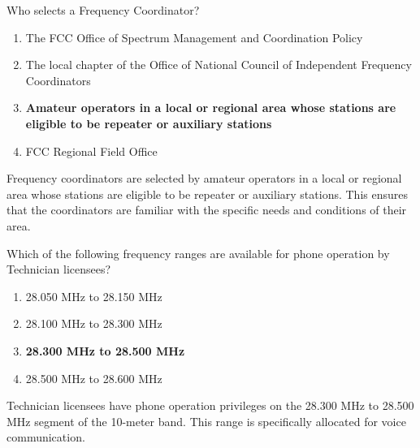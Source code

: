 
\begin{tcolorbox}[colback=gray!10!white,colframe=black!75!black,title={T1A09}]
    Who selects a Frequency Coordinator?
    \begin{enumerate}[label=\Alph*,noitemsep]
        \item The FCC Office of Spectrum Management and Coordination Policy
        \item The local chapter of the Office of National Council of Independent Frequency Coordinators
        \item \textbf{Amateur operators in a local or regional area whose stations are eligible to be repeater or auxiliary stations}
        \item FCC Regional Field Office
    \end{enumerate}
\end{tcolorbox}
Frequency coordinators are selected by amateur operators in a local or regional area whose stations are eligible to be repeater or auxiliary stations. This ensures that the coordinators are familiar with the specific needs and conditions of their area.


\begin{tcolorbox}[colback=gray!10!white,colframe=black!75!black,title={T1B01}]
    Which of the following frequency ranges are available for phone operation by Technician licensees?
    \begin{enumerate}[label=\Alph*,noitemsep]
        \item 28.050 MHz to 28.150 MHz
        \item 28.100 MHz to 28.300 MHz
        \item \textbf{28.300 MHz to 28.500 MHz}
        \item 28.500 MHz to 28.600 MHz
    \end{enumerate}
\end{tcolorbox}
Technician licensees have phone operation privileges on the 28.300 MHz to 28.500 MHz segment of the 10-meter band. This range is specifically allocated for voice communication.


